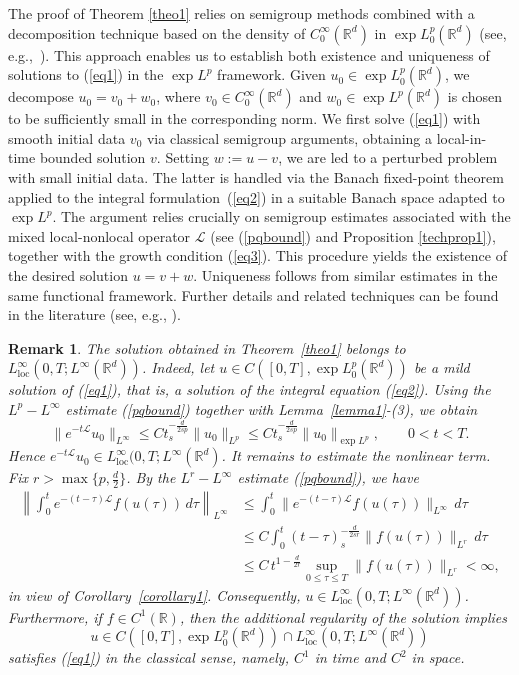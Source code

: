 \documentclass[a4paper,11pt]{amsart}
\renewcommand\eqref[1]{(\ref{#1})} %
\newtheorem{remark}{Remark}
\numberwithin{equation}{section}
\theoremstyle{plain}
\theoremstyle{definition}
\begin{document}
 The proof of Theorem \ref{theo1} relies on semigroup methods combined with a decomposition technique based on the density of $C_0^\infty(\mathbb{R}^d)$ in $\exp L^p_0(\mathbb{R}^d)$ (see, e.g.,~\cite{Ibrahim, Ioku, Majdoub1, Majdoub2}). This approach enables us to establish both existence and uniqueness of solutions to \eqref{eq1} in the $\exp L^p$ framework. Given $u_{0} \in \exp L^{p}_{0}(\mathbb{R}^{d})$, we decompose $u_{0} = v_{0} + w_{0}$, where $v_{0} \in C_{0}^{\infty}(\mathbb{R}^{d})$ and $w_{0} \in \exp L^{p}(\mathbb{R}^{d})$ is chosen to be sufficiently small in the corresponding norm. We first solve \eqref{eq1} with smooth initial data $v_{0}$ via classical semigroup arguments, obtaining a local-in-time bounded solution $v$. Setting $w := u - v$, we are led to a perturbed problem with small initial data. The latter is handled via the Banach fixed-point theorem applied to the integral formulation~\eqref{eq2} in a suitable Banach space adapted to $\exp L^p$. The argument relies crucially on semigroup estimates associated with the mixed local-nonlocal operator $\mathcal{L}$ (see \eqref{pqbound} and Proposition \ref{techprop1}), together with the growth condition \eqref{eq3}. This procedure yields the existence of the desired solution $u = v + w$. Uniqueness follows from similar estimates in the same functional framework. Further details and related techniques can be found in the literature (see, e.g., \cite{FK20,Ioku,Majdoub2}).
\begin{remark}
The solution obtained in Theorem~\ref{theo1} belongs to 
$L^\infty_{\mathrm{loc}}(0,T;L^\infty(\mathbb{R}^d))$. Indeed, let 
$
u\in C([0,T],\exp L^p_0(\mathbb{R}^d))
$
be a mild solution of \eqref{eq1}, that is, a solution of the integral equation \eqref{eq2}. 
Using the $L^p-L^\infty$ estimate \eqref{pqbound} together with 
Lemma~\ref{lemma1}-(3), we obtain
\[
\|e^{-t\mathcal{L}}u_0\|_{L^\infty}
\le C t_s^{-\frac{d}{2sp}}
\|u_0\|_{L^p}
\le C t_s^{-\frac{d}{2sp}}
\|u_0\|_{\exp L^p},
\qquad 0<t<T.
\]
Hence $e^{-t\mathcal{L}}u_0 \in  L^\infty_{\mathrm{loc}}(0,T;L^\infty(\mathbb{R}^d)$. It remains to estimate the nonlinear term. Fix $r>\max\{p,\frac{d}{2}\}$. 
By the $L^r-L^\infty$ estimate \eqref{pqbound}, we have
\[
\begin{aligned}
\left\|\int_0^t e^{-(t-\tau)\mathcal{L}} f(u(\tau))\, d\tau \right\|_{L^\infty}
&\le \int_0^t 
\|e^{-(t-\tau)\mathcal{L}} f(u(\tau))\|_{L^\infty}
\, d\tau \\
&\le C \int_0^t (t-\tau)_s^{-\frac{d}{2sr}}
\|f(u(\tau))\|_{L^r}
\, d\tau \\
&\le C\,t^{1-\frac{d}{2r}}
\sup_{0\le \tau\le T}
\|f(u(\tau))\|_{L^r}
<\infty,
\end{aligned}
\]
in view of Corollary~\ref{corollary1}. Consequently, $u \in L^\infty_{\mathrm{loc}}(0,T;L^\infty(\mathbb{R}^d))$.
Furthermore, if $f\in C^1(\mathbb{R})$, then the additional regularity of the solution implies
\[
u \in C([0,T],\exp L^p_0(\mathbb{R}^d))
\cap L^\infty_{\mathrm{loc}}(0,T;L^\infty(\mathbb{R}^d))
\]
satisfies \eqref{eq1} in the classical sense, namely,
$C^1$ in time and $C^2$ in space.
\end{remark}
\end{document}
